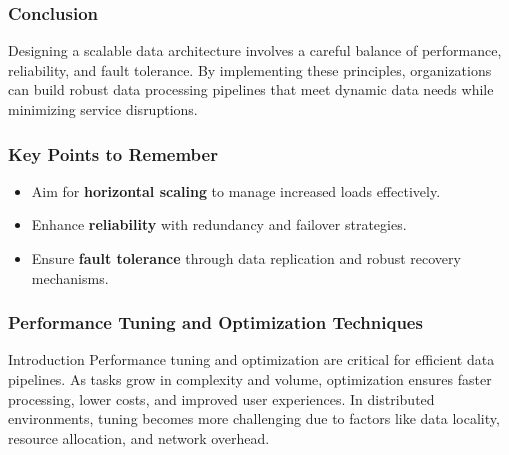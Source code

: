 \documentclass{beamer}
\begin{document}
\begin{frame}
    \frametitle{Conclusion}
    Designing a scalable data architecture involves a careful balance of performance, reliability, and fault tolerance. 
    By implementing these principles, organizations can build robust data processing pipelines that meet dynamic data needs while minimizing service disruptions.
\end{frame}

\begin{frame}
    \frametitle{Key Points to Remember}
    \begin{itemize}
        \item Aim for \textbf{horizontal scaling} to manage increased loads effectively.
        \item Enhance \textbf{reliability} with redundancy and failover strategies.
        \item Ensure \textbf{fault tolerance} through data replication and robust recovery mechanisms.
    \end{itemize}
\end{frame}

\begin{frame}[fragile]
    \frametitle{Performance Tuning and Optimization Techniques}
    \begin{block}{Introduction}
        Performance tuning and optimization are critical for efficient data pipelines. 
        As tasks grow in complexity and volume, optimization ensures faster processing, lower costs, and improved user experiences.
        In distributed environments, tuning becomes more challenging due to factors like data locality, resource allocation, and network overhead.
    \end{block}
\end{frame}
\end{document}
